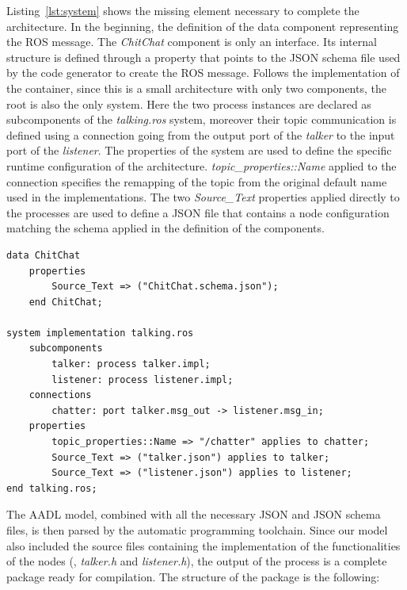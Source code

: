 Listing~\ref{lst:system} shows the missing element necessary to complete the architecture. In the beginning, the definition of the data component representing the ROS message. The \textit{ChitChat} component is only an interface. Its internal structure is defined through a property that points to the JSON schema file used by the code generator to create the ROS message. Follows the implementation of the container, since this is a small architecture with only two components, the root is also the only system. Here the two process instances are declared as subcomponents of the \textit{talking.ros} system, moreover their topic communication is defined using a connection going from the output port of the \textit{talker} to the input port of the \textit{listener}. The properties of the system are used to define the specific runtime configuration of the architecture. \textit{topic\_properties::Name} applied to the connection specifies the remapping of the topic from the original default name used in the implementations. The two \textit{Source\_Text} properties applied directly to the processes are used to define a JSON file that contains a node configuration matching the schema applied in the definition of the components. 

\begin{lstlisting}[language=AADL,caption={Message and system definition.},label=lst:system]
data ChitChat
	properties
		Source_Text => ("ChitChat.schema.json");
	end ChitChat;
	
system implementation talking.ros
	subcomponents
		talker: process talker.impl;
		listener: process listener.impl;
	connections
		chatter: port talker.msg_out -> listener.msg_in;
	properties
		topic_properties::Name => "/chatter" applies to chatter;
		Source_Text => ("talker.json") applies to talker;
		Source_Text => ("listener.json") applies to listener;
end talking.ros;
\end{lstlisting}

The AADL model, combined with all the necessary JSON and JSON schema files, is then parsed by the automatic programming toolchain. Since our model also included the source files containing the implementation of the functionalities of the nodes (\ie, \textit{talker.h} and \textit{listener.h}), the output of the process is a complete package ready for compilation. The structure of the package is the following:

